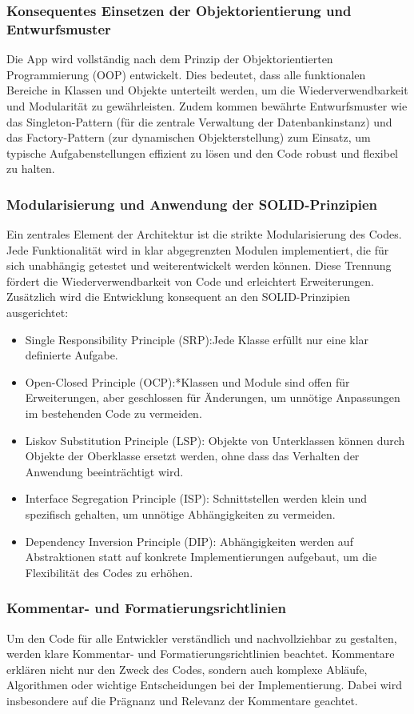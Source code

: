 \subsubsection{Konsequentes Einsetzen der Objektorientierung und Entwurfsmuster}
Die App wird vollständig nach dem Prinzip der Objektorientierten Programmierung (OOP) entwickelt. Dies bedeutet, dass alle funktionalen Bereiche in Klassen und Objekte unterteilt werden, um die Wiederverwendbarkeit und Modularität zu gewährleisten. Zudem kommen bewährte Entwurfsmuster wie das Singleton-Pattern (für die zentrale Verwaltung der Datenbankinstanz) und das Factory-Pattern (zur dynamischen Objekterstellung) zum Einsatz, um typische Aufgabenstellungen effizient zu lösen und den Code robust und flexibel zu halten.

\subsubsection{Modularisierung und Anwendung der SOLID-Prinzipien}
Ein zentrales Element der Architektur ist die strikte Modularisierung des Codes. Jede Funktionalität wird in klar abgegrenzten Modulen implementiert, die für sich unabhängig getestet und weiterentwickelt werden können. Diese Trennung fördert die Wiederverwendbarkeit von Code und erleichtert Erweiterungen. Zusätzlich wird die Entwicklung konsequent an den SOLID-Prinzipien ausgerichtet:
\begin{itemize}
    \item Single Responsibility Principle (SRP):Jede Klasse erfüllt nur eine klar definierte Aufgabe.
    \item Open-Closed Principle (OCP):*Klassen und Module sind offen für Erweiterungen, aber geschlossen für Änderungen, um unnötige Anpassungen im bestehenden Code zu vermeiden.
    \item Liskov Substitution Principle (LSP): Objekte von Unterklassen können durch Objekte der Oberklasse ersetzt werden, ohne dass das Verhalten der Anwendung beeinträchtigt wird.
    \item Interface Segregation Principle (ISP): Schnittstellen werden klein und spezifisch gehalten, um unnötige Abhängigkeiten zu vermeiden.
    \item Dependency Inversion Principle (DIP): Abhängigkeiten werden auf Abstraktionen statt auf konkrete Implementierungen aufgebaut, um die Flexibilität des Codes zu erhöhen.
\end{itemize}

\subsubsection{Kommentar- und Formatierungsrichtlinien}
Um den Code für alle Entwickler verständlich und nachvollziehbar zu gestalten, werden klare Kommentar- und Formatierungsrichtlinien beachtet. Kommentare erklären nicht nur den Zweck des Codes, sondern auch komplexe Abläufe, Algorithmen oder wichtige Entscheidungen bei der Implementierung. Dabei wird insbesondere auf die Prägnanz und Relevanz der Kommentare geachtet.

